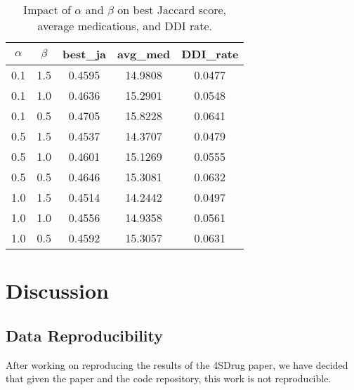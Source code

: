 \documentclass[letterpaper]{article} %
\begin{document}
\begin{table}[ht]
\centering
\begin{tabular}{|c|c||c|c|c|}
\hline
\textbf{$\alpha$} & \textbf{$\beta$} & \textbf{best\_ja} & \textbf{avg\_med} & \textbf{DDI\_rate} \\
\hline
0.1 & 1.5 & 0.4595 & 14.9808 & 0.0477 \\
0.1 & 1.0 & 0.4636 & 15.2901 & 0.0548 \\
0.1 & 0.5 & 0.4705 & 15.8228 & 0.0641 \\
0.5 & 1.5 & 0.4537 & 14.3707 & 0.0479 \\
0.5 & 1.0 & 0.4601 & 15.1269 & 0.0555 \\
0.5 & 0.5 & 0.4646 & 15.3081 & 0.0632 \\
1.0 & 1.5 & 0.4514 & 14.2442 & 0.0497 \\
1.0 & 1.0 & 0.4556 & 14.9358 & 0.0561 \\
1.0 & 0.5 & 0.4592 & 15.3057 & 0.0631 \\
\hline
\end{tabular}
\caption{Impact of $\alpha$ and $\beta$ on best Jaccard score, average medications, and DDI rate.}
\label{tab:alpha_beta_effects}
\end{table}







\section{Discussion}

\subsection{Data Reproducibility}
After working on reproducing the results of the 4SDrug paper, we have decided that given the paper and the code repository, this work is not reproducible. 
\end{document}
